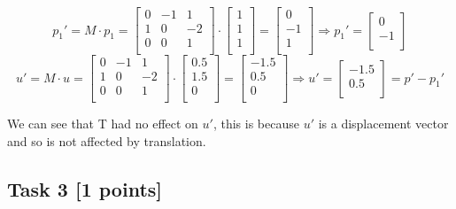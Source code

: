 \documentclass{article}
\begin{document}
\[
    p_1' = M \cdot p_1 =
    \begin{bmatrix}
        0 & -1 & 1  \\
        1 & 0  & -2 \\
        0 & 0  & 1  \\
    \end{bmatrix}
    \cdot
    \begin{bmatrix}
        1 \\
        1 \\
        1 \\
    \end{bmatrix}
    =
    \begin{bmatrix}
        0  \\
        -1 \\
        1  \\
    \end{bmatrix}
    \Rightarrow
    p_1' =
    \begin{bmatrix}
        0  \\
        -1 \\
    \end{bmatrix}
\]
\[
    u' = M \cdot u =
    \begin{bmatrix}
        0 & -1 & 1  \\
        1 & 0  & -2 \\
        0 & 0  & 1  \\
    \end{bmatrix}
    \cdot
    \begin{bmatrix}
        0.5 \\
        1.5 \\
        0   \\
    \end{bmatrix}
    =
    \begin{bmatrix}
        -1.5 \\
        0.5  \\
        0    \\
    \end{bmatrix}
    \Rightarrow
    u' =
    \begin{bmatrix}
        -1.5 \\
        0.5  \\
    \end{bmatrix}
    = p' - p_1'
\]

We can see that T had no effect on $u'$, this is because $u'$ is a displacement vector and so is not affected by translation.

\subsection*{Task 3 [1 points]}
\end{document}
